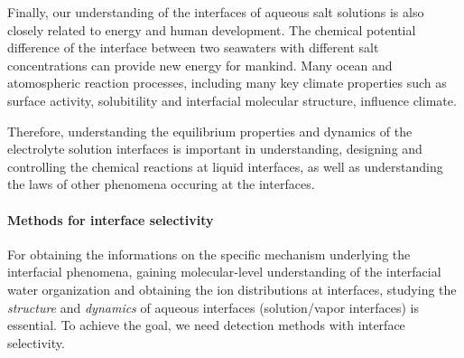 
Finally, our understanding of the interfaces of aqueous salt solutions is also closely related to energy and human development. 
The chemical potential difference of the interface between two seawaters with different salt concentrations can provide new energy for mankind\cite{Pattle1954,Loeb1976}. 
Many ocean and atomospheric reaction processes, including many key climate properties such as surface activity, 
solubitility and interfacial molecular structure, influence climate\cite{Schill2015,Cochran2017}. 

Therefore, understanding the equilibrium properties and dynamics of the electrolyte solution interfaces 
is important in understanding, designing and controlling the chemical reactions at liquid interfaces\cite{Chang06}, 
as well as understanding the laws of other phenomena occuring at the interfaces. 

\paragraph{Methods for interface selectivity}
For obtaining the informations on the specific mechanism underlying the interfacial phenomena,
gaining molecular-level understanding of the interfacial water organization and obtaining the ion distributions at interfaces,
studying the \emph{structure} and \emph{dynamics} of aqueous interfaces (solution/vapor interfaces) is essential.
To achieve the goal, we need detection methods with interface selectivity. 

